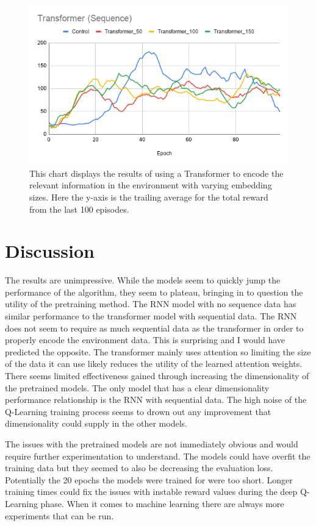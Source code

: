 \documentclass[11pt, twocolumn]{article}
\begin{document}
\begin{figure}
\begin{center}
\includegraphics[scale=0.35]{smart_transformer.png}
\caption{This chart displays the results of using a Transformer to encode the relevant information in the environment with varying embedding sizes. Here the y-axis is the trailing average for the total reward from the last 100 episodes.}
\label{fig:smart_transformer}
\end{center}
\end{figure}


\section{Discussion}
The results are unimpressive. While the models seem to quickly jump the performance of the algorithm, they seem to plateau, bringing in to question the utility of the pretraining method. The RNN model with no sequence data has similar performance to the transformer model with sequential data. The RNN does not seem to require as much sequential data as the transformer in order to properly encode the environment data. This is surprising and I would have predicted the opposite. The transformer mainly uses attention so limiting the size of the data it can use likely reduces the utility of the learned attention weights. There seems limited effectiveness gained through increasing the dimensionality of the pretrained models. The only model that has a clear dimensionality performance relationship is the RNN with sequential data. The high noise of the Q-Learning training process seems to drown out any improvement that dimensionality could supply in the other models.

The issues with the pretrained models are not immediately obvious and would require further experimentation to understand. The models could have overfit the training data but they seemed to also be decreasing the evaluation loss. Potentially the 20 epochs the models were trained for were too short. Longer training times could fix the issues with instable reward values during the deep Q-Learning phase. When it comes to machine learning there are always more experiments that can be run.	



\end{document}
